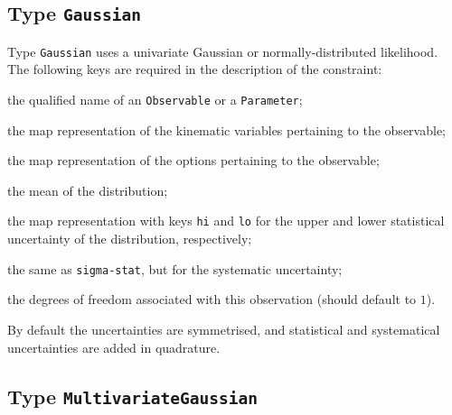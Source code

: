 \subsection{Type \texttt{Gaussian}}

Type \texttt{Gaussian} uses a univariate Gaussian or normally-distributed
likelihood. The following keys are required in the description of the
constraint:
\begin{description}[labelwidth=.15\textwidth]
    \item[\texttt{observable}] the qualified name of an \texttt{Observable} or a \texttt{Parameter};
    \item[\texttt{kinematics}] the map representation of the kinematic variables pertaining to the observable;
    \item[\texttt{options}] the map representation of the options pertaining to the observable;
    \item[\texttt{mean}] the mean of the distribution;
    \item[\texttt{sigma-stat}] the map representation with keys \texttt{hi} and \texttt{lo} for the
    upper and lower statistical uncertainty of the distribution, respectively;
    \item[\texttt{sigma-sys}] the same as \texttt{sigma-stat}, but for the systematic uncertainty;
    \item[\texttt{dof}] the degrees of freedom associated with this observation (should default to $1$).
\end{description}
By default the uncertainties are symmetrised, and statistical and systematical
uncertainties are added in quadrature.

\subsection{Type \texttt{MultivariateGaussian}}

